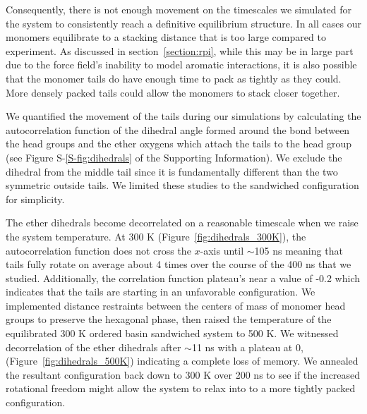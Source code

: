 \documentclass[journal=jpcbfk,manuscript=article]{achemso}
\begin{document}
  Consequently, there is not enough movement on the timescales we simulated for the system to 
  consistently reach a definitive equilibrium structure.
  In all cases our monomers
  equilibrate to a stacking distance that is too large compared to experiment. 
  As discussed in section~\ref{section:rpi},
  while this may be in large part due to the force field's inability to model aromatic
  interactions, it is also possible that the monomer tails do have enough time to pack 
  as tightly as they could. More densely packed tails could allow the monomers to stack
  closer together. 
  
  We quantified the movement of the tails during our simulations by calculating the 
  autocorrelation function of the dihedral angle formed around the bond between the 
  head groups and the ether oxygens which attach the tails to the head group 
  (see Figure S-\ref{S-fig:dihedrals} of the Supporting Information). We exclude the dihedral from the middle tail 
  since it is fundamentally different than the two symmetric outside tails. We 
  limited these studies to the sandwiched configuration for simplicity.
  
  The ether dihedrals become decorrelated on a reasonable timescale when we raise
  the system temperature. At 300 K (Figure~\ref{fig:dihedrals_300K}), the autocorrelation function does
  not cross the $x$-axis until $\sim$105 ns meaning that tails fully rotate on average about 
  4 times over the course of the 400 ns that we studied. Additionally, the correlation 
  function plateau's near a value of -0.2 which indicates that the tails are starting in 
  an unfavorable configuration. We implemented distance restraints between the centers of 
  mass of monomer head groups to preserve the hexagonal phase, then raised the temperature 
  of the equilibrated 300 K ordered basin sandwiched system to 500 K. We witnessed 
  decorrelation of the ether dihedrals after $\sim$11 ns with a plateau at 0, 
  (Figure~\ref{fig:dihedrals_500K}) indicating a complete loss of memory. We annealed
  the resultant configuration back down to 300 K over 200 ns to see if the increased rotational
  freedom might allow the system to relax into to a more tightly packed configuration.
  
\end{document}
